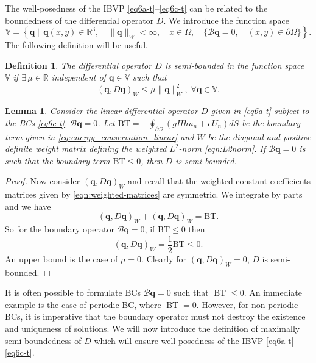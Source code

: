 \documentclass{article}
\numberwithin{equation}{section}
\newtheorem{definition}{Definition}
\newtheorem{lemma}{Lemma}
\theoremstyle{definition}
\begin{document}
The well-posedness of the IBVP \eqref{eq6a-t}--\eqref{eq6c-t} can be related to the boundedness of the differential operator $D$. We introduce the function space 
\begin{equation}\label{eq:functionspace_V}
\mathbb{V}=\left\{\mathbf{q} \mid \, \mathbf{q}(x,y) \in \mathbb{R}^3, \quad\|\mathbf{q}\|_W<\infty, \quad x \in \Omega, \quad\{\mathcal{B} \mathbf{q}=0, \quad (x,y) \in \partial \Omega\}\right\}.
\end{equation}
The following definition will be useful.
\begin{definition}\label{def:semibounded}
The differential operator $D$ is semi-bounded in the function space $\mathbb{V}$ if $\exists \, \mu \in \mathbb{R}$ independent of $\mathbf{q} \in \mathbb{V}$ such that
$$ 
(\mathbf{q}, D\mathbf{q})_W \leq \mu \|\mathbf{q}\|^2_W, \; \forall \mathbf{q} \in \mathbb{V}.
$$
\end{definition}
\begin{lemma}\label{lem:semi-bounded_BT}
Consider the linear differential operator { $D$} given in \eqref{eq6a-t} subject to the BCs \eqref{eq6c-t}, $\mathcal{B}\mathbf{q} = 0$.
Let $\mathrm{BT} = -\oint_{\partial \Omega}(gHh{u}_n + e{U}_n) dS$ be the boundary term given in \eqref{eq:energy_conservation_linear} and $W$ be the diagonal and positive definite  weight matrix defining the weighted $L^2$-norm \eqref{eqn:L2norm}. If $\mathcal{B}\mathbf{q} = 0$ is such that  the boundary term   $\mathrm{BT}\le 0$, then $D$ is semi-bounded.
\end{lemma}
\begin{proof}
Now consider $(\mathbf{q}, D\mathbf{q})_{W  }$ and recall that the weighted constant coefficients matrices given by \eqref{eqn:weighted-matrices} are symmetric. We integrate by parts and we have 
$$
(\mathbf{q}, D\mathbf{q})_{W  } + (\mathbf{q}, D\mathbf{q})_{W  }  = \mathrm{BT}.
$$
So for the boundary operator $\mathcal{B}\mathbf{q} = 0$, if $\mathrm{BT}\le 0$ then 
$$(\mathbf{q}, D\mathbf{q})_{W  } = \frac{1}{2}\mathrm{BT} \le 0.$$
 An upper bound is the case of $\mu=0$. Clearly for $(\mathbf{q}, D\mathbf{q})_{W  } =0$,  $D$ is semi-bounded.
\end{proof}
\noindent
It is often possible to formulate BCs $\mathcal{B}\mathbf{q} =0$ such that $\operatorname{BT} \le 0$. An immediate example is the case of periodic BC, where $\operatorname{BT} = 0$. However, for non-periodic BCs, it is imperative that the boundary operator must not destroy the  existence and uniqueness of solutions. We will now introduce the definition of maximally semi-boundedness of $D$ which will ensure well-posedness of the IBVP \eqref{eq6a-t}--\eqref{eq6c-t}.
\end{document}
